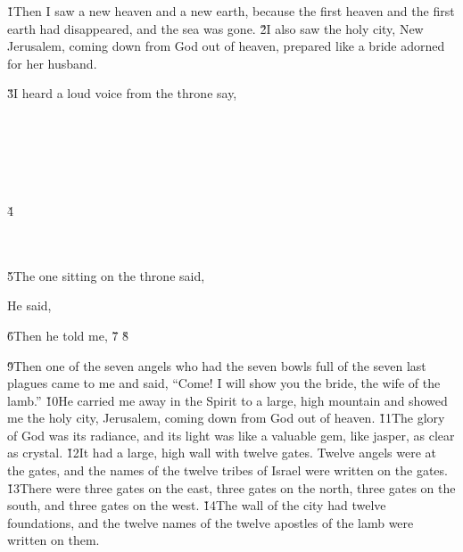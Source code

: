 \v{1}Then I saw a new heaven and a new earth, because the first heaven and the first earth had disappeared, and the sea was gone. \v{2}I also saw the holy city, New Jerusalem, coming down from God out of heaven, prepared like a bride adorned for her husband.

\v{3}I heard a loud voice from the throne say,

\begin{poetry}
\poeml {} \\
\poemll    {} \\
\poemlll       {} \\
\poeml {} \\
\poemll    {} \\
\poeml \v{4} \\
\poemll    {} \\
\poeml {} \\
\poemll    {}
\end{poetry}

\v{5}The one sitting on the throne said, 

He said, 

\v{6}Then he told me,  \v{7} \v{8}

\v{9}Then one of the seven angels who had the seven bowls full of the seven last plagues came to me and said, ``Come! I will show you the bride, the wife of the lamb.'' \v{10}He carried me away in the Spirit to a large, high mountain and showed me the holy city, Jerusalem, coming down from God out of heaven. \v{11}The glory of God was its radiance, and its light was like a valuable gem, like jasper, as clear as crystal. \v{12}It had a large, high wall with twelve gates. Twelve angels were at the gates, and the names of the twelve tribes of Israel were written on the gates. \v{13}There were three gates on the east, three gates on the north, three gates on the south, and three gates on the west. \v{14}The wall of the city had twelve foundations, and the twelve names of the twelve apostles of the lamb were written on them.

